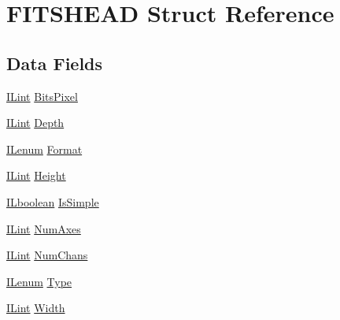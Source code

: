 \hypertarget{struct_f_i_t_s_h_e_a_d}{\section{F\-I\-T\-S\-H\-E\-A\-D Struct Reference}
\label{struct_f_i_t_s_h_e_a_d}
}
\subsection*{Data Fields}
\begin{DoxyCompactItemize}
\item 
\hyperlink{il_8h_a288a97fb9e92e707a60b749d0039fafe}{I\-Lint} \hyperlink{struct_f_i_t_s_h_e_a_d_a397de374e874225b7363e3f0832f06f1}{Bits\-Pixel}
\item 
\hyperlink{il_8h_a288a97fb9e92e707a60b749d0039fafe}{I\-Lint} \hyperlink{struct_f_i_t_s_h_e_a_d_ab1eae80483c0ec4d2e904165edc82c1e}{Depth}
\item 
\hyperlink{il_8h_a1542f3a70c0c5370a30a1fa5ce349e2d}{I\-Lenum} \hyperlink{struct_f_i_t_s_h_e_a_d_aab6d023e52ab2d90be412df75a42abfb}{Format}
\item 
\hyperlink{il_8h_a288a97fb9e92e707a60b749d0039fafe}{I\-Lint} \hyperlink{struct_f_i_t_s_h_e_a_d_a6ab8e5a8c7842b5a57104e36b9a49f33}{Height}
\item 
\hyperlink{il_8h_a8be80d75c2c636b9f2250fe10c2e7874}{I\-Lboolean} \hyperlink{struct_f_i_t_s_h_e_a_d_a218ba58308d28b300d922e84c373511d}{Is\-Simple}
\item 
\hyperlink{il_8h_a288a97fb9e92e707a60b749d0039fafe}{I\-Lint} \hyperlink{struct_f_i_t_s_h_e_a_d_ab141743634f89bdf4f7c4870245458e4}{Num\-Axes}
\item 
\hyperlink{il_8h_a288a97fb9e92e707a60b749d0039fafe}{I\-Lint} \hyperlink{struct_f_i_t_s_h_e_a_d_a4cf59287266f4d82f9ad279b98f7d457}{Num\-Chans}
\item 
\hyperlink{il_8h_a1542f3a70c0c5370a30a1fa5ce349e2d}{I\-Lenum} \hyperlink{struct_f_i_t_s_h_e_a_d_a437e4fc3b579e2e7879dedd0fd2ac587}{Type}
\item 
\hyperlink{il_8h_a288a97fb9e92e707a60b749d0039fafe}{I\-Lint} \hyperlink{struct_f_i_t_s_h_e_a_d_a0bebc214dbd5f199ad36aefd13feb6e7}{Width}
\end{DoxyCompactItemize}


